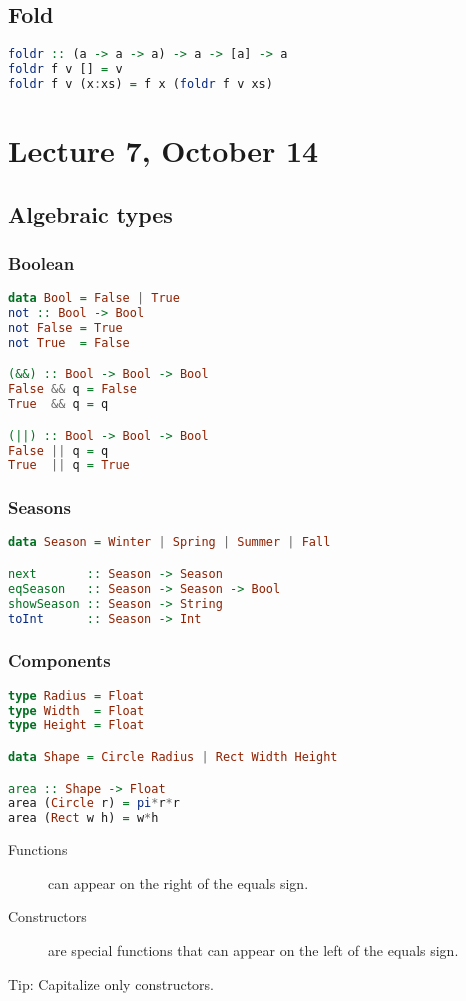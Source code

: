 \documentclass{article}
\begin{document}
\subsection{Fold}
\begin{lstlisting}[language=haskell]
foldr :: (a -> a -> a) -> a -> [a] -> a
foldr f v [] = v
foldr f v (x:xs) = f x (foldr f v xs)
\end{lstlisting}
\section{Lecture 7, October 14}
\subsection{Algebraic types}
\subsubsection{Boolean}
\begin{lstlisting}[language=haskell]
data Bool = False | True
not :: Bool -> Bool
not False = True
not True  = False

(&&) :: Bool -> Bool -> Bool
False && q = False
True  && q = q

(||) :: Bool -> Bool -> Bool
False || q = q
True  || q = True
\end{lstlisting}
\subsubsection{Seasons}
\begin{lstlisting}[language=haskell]
data Season = Winter | Spring | Summer | Fall

next       :: Season -> Season
eqSeason   :: Season -> Season -> Bool
showSeason :: Season -> String
toInt      :: Season -> Int
\end{lstlisting}
\subsubsection{Components}
\begin{lstlisting}[language=haskell]
type Radius = Float
type Width  = Float
type Height = Float

data Shape = Circle Radius | Rect Width Height

area :: Shape -> Float
area (Circle r) = pi*r*r
area (Rect w h) = w*h
\end{lstlisting}
\begin{description}
    \item[Functions] can appear on the right of the equals sign.
    \item[Constructors] are special functions that can appear on the left of the equals sign.
\end{description} 
Tip: Capitalize only constructors.
\end{document}
